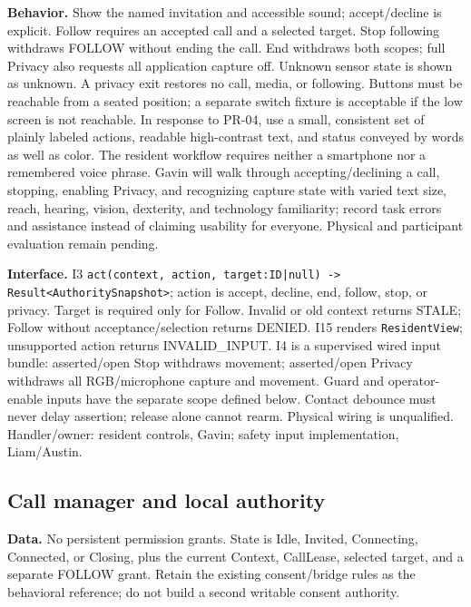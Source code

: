 \documentclass[12pt,letterpaper]{article}
\newcommand{\field}[1]{\texttt{#1}}
\begin{document}
\textbf{Behavior.} Show the named invitation and accessible sound; accept/decline is explicit. Follow requires an accepted call and a selected target. Stop following withdraws FOLLOW without ending the call. End withdraws both scopes; full Privacy also requests all application capture off. Unknown sensor state is shown as unknown. A privacy exit restores no call, media, or following. Buttons must be reachable from a seated position; a separate switch fixture is acceptable if the low screen is not reachable. In response to PR-04, use a small, consistent set of plainly labeled actions, readable high-contrast text, and status conveyed by words as well as color. The resident workflow requires neither a smartphone nor a remembered voice phrase. Gavin will walk through accepting/declining a call, stopping, enabling Privacy, and recognizing capture state with varied text size, reach, hearing, vision, dexterity, and technology familiarity; record task errors and assistance instead of claiming usability for everyone. Physical and participant evaluation remain pending.

\textbf{Interface.} I3 \field{act(context, action, target:ID|null) -> Result<AuthoritySnapshot>}; action is accept, decline, end, follow, stop, or privacy. Target is required only for Follow. Invalid or old context returns STALE; Follow without acceptance/selection returns DENIED. I15 renders \field{ResidentView}; unsupported action returns INVALID\_\allowbreak{}INPUT. I4 is a supervised wired input bundle: asserted/open Stop withdraws movement; asserted/open Privacy withdraws all RGB/microphone capture and movement. Guard and operator-enable inputs have the separate scope defined below. Contact debounce must never delay assertion; release alone cannot rearm. Physical wiring is unqualified. Handler/owner: resident controls, Gavin; safety input implementation, Liam/Austin.

\subsection*{Call manager and local authority}
\textbf{Data.} No persistent permission grants. State is Idle, Invited, Connecting, Connected, or Closing, plus the current Context, CallLease, selected target, and a separate FOLLOW grant. Retain the existing consent/bridge rules as the behavioral reference; do not build a second writable consent authority.
\end{document}
